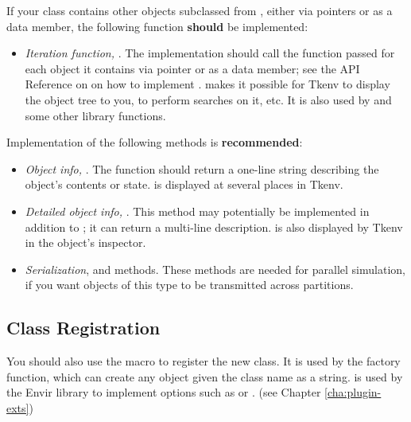 If your class contains other objects subclassed from ,
either via pointers or as a data member, the following function \textbf{should}
be implemented:

\begin{itemize}
  \item{\textit{Iteration function,} .
        The implementation should call the function passed
        for each object it contains via pointer or as a data member;
        see the API Reference on  on how to implement
        .  makes it possible
        for Tkenv to display the object tree to you, to perform searches on it, etc.
        It is also used by  and some other library functions.}
\end{itemize}

Implementation of the following methods is \textbf{recommended}:

\begin{itemize}
  \item{\textit{Object info,} . The  function
        should return a one-line string describing the object's contents or state.
         is displayed at several places in Tkenv.}
  \item{\textit{Detailed object info,} .
        This method may potentially be implemented in addition to ;
        it can return a multi-line description.  is also
        displayed by Tkenv in the object's inspector.}
  \item{\textit{Serialization},  and  methods.
        These methods are needed for parallel simulation, if you want
        objects of this type to be transmitted across partitions.}
\end{itemize}


\subsection{Class Registration}

You should also use the  macro to register the
new class. It is used by the  factory function, which can
create any object given the class name as a string. 
is used by the Envir library to implement  options
such as  or .
(see Chapter \ref{cha:plugin-exts})

